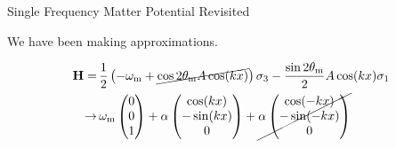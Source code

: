\begin{frame}{Single Frequency Matter Potential Revisited}

We have been making approximations.


\begin{align*}
    \mathbf {H} =\,& \frac{1}{2}\left( - \omega_{\mathrm{m}}
    +\cancel{
     \cos 2\theta_{\mathrm{m}}{A\cos(kx)} } \right) \sigma_3 - \frac{  \sin 2\theta_{\mathrm{m}
    }
    }{2}{A \cos(kx)}  \sigma_1 \\
    \to\, &  \omega_{\mathrm m}\begin{pmatrix}
    0\\
    0\\
    1
    \end{pmatrix} + \alpha \begin{pmatrix}
    \cos (kx)\\
    -\sin(k x)\\
    0
    \end{pmatrix}  + \cancel{\alpha \begin{pmatrix}
    \cos (-kx)\\
    -\sin( - k x)\\
    0
    \end{pmatrix}
    }
\end{align*}


\end{frame}






